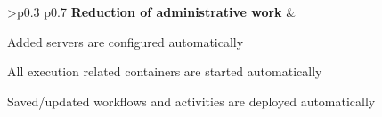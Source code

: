 \begin{table}[p!]
\begin{tabular}[t]{>{\raggedleft}p{0.3\customtabwidth} p{0.7\customtabwidth}}
      \textbf{Reduction of administrative work}
        & \begin{minipage}[t]{\linewidth} \begin{tabitemize}
            \item Added servers are configured automatically
            \item All execution related containers are started automatically
            \item Saved/updated workflows and activities are deployed automatically
          \end{tabitemize} \end{minipage} \\
      \bottomrule
    \end{tabular}
    \caption{Objectives and their respective requirements}
    \label{tab:data_objectives_and_requirements}
  \end{table}

